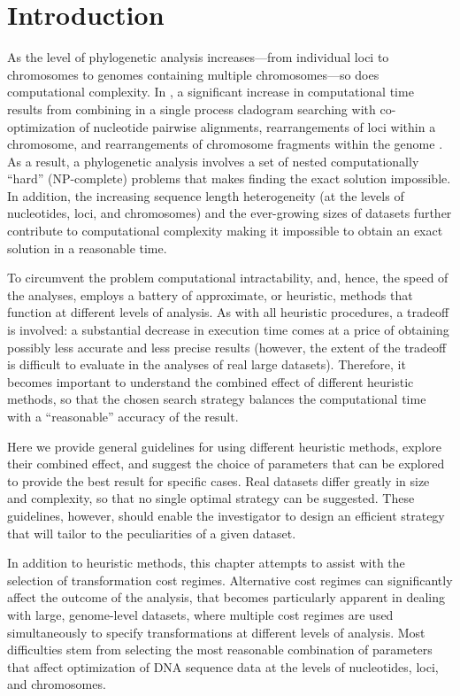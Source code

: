 \section{Introduction}

As the level of phylogenetic analysis increases---from individual loci to chromosomes to genomes containing multiple chromosomes---so does computational complexity. In \poy, a significant increase in computational time results from combining in a single process cladogram searching with co-optimization of nucleotide pairwise alignments, rearrangements of loci within a chromosome, and rearrangements of chromosome fragments within the genome . As a result, a phylogenetic analysis involves a set of nested computationally ``hard'' (NP-complete) problems that makes finding the exact solution impossible. In addition, the increasing sequence length heterogeneity (at the levels of nucleotides, loci, and chromosomes) and the ever-growing sizes of datasets further contribute to computational complexity making it impossible to obtain an exact solution in a reasonable time.

To circumvent the problem computational intractability, and, hence, the speed of the analyses, \poy employs a battery of approximate, or heuristic, methods that function at different levels of analysis. As with all heuristic procedures, a tradeoff is involved: a substantial decrease in execution time comes at a price of obtaining possibly less accurate  and less precise results (however, the extent of the tradeoff is difficult to evaluate in the analyses of real large datasets). Therefore, it becomes important to understand the combined effect of different heuristic methods, so that the chosen search strategy balances the computational time with a ``reasonable'' accuracy of the result.

Here we provide general guidelines for using different heuristic methods, explore their combined effect, and suggest the choice of parameters that can be explored to provide the best result for specific cases. Real datasets differ greatly in size and complexity, so that no single optimal strategy can be suggested. These guidelines, however, should enable the investigator to design an efficient strategy that will tailor to the peculiarities of a given dataset.

In addition to heuristic methods, this chapter attempts to assist with the selection of transformation cost regimes. Alternative cost regimes can significantly affect the outcome of the analysis, that becomes particularly apparent in dealing with large, genome-level datasets, where multiple cost regimes are used simultaneously to specify transformations at different levels of analysis. Most difficulties stem from selecting the most reasonable combination of parameters that affect optimization of DNA sequence data at the levels of nucleotides, loci, and chromosomes.


